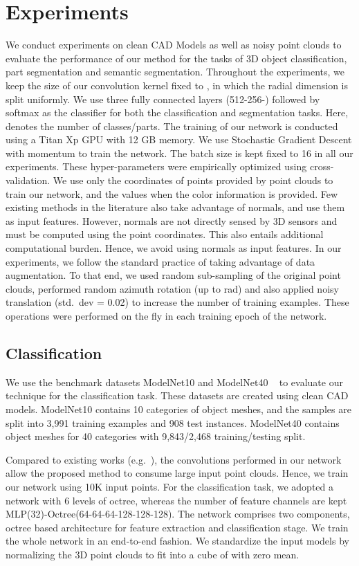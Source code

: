 \documentclass[10pt,twocolumn,letterpaper]{article}
\begin{document}
{\section{Experiments}
\vspace{-2mm}
We conduct experiments on clean CAD Models as well as noisy  point clouds to evaluate the performance of our method for the tasks of 3D object classification, part segmentation and semantic segmentation. Throughout the experiments, we keep the size of our convolution kernel fixed to  , in which the radial dimension is split uniformly. We use three fully connected layers (512-256-) followed by softmax as the classifier for both the classification and segmentation tasks. Here,  denotes the number of classes/parts.
The training of our network is conducted using a Titan Xp GPU with 12 GB memory.
We use Stochastic Gradient Descent with momentum to train the network. The batch size  is kept fixed to 16 in all our experiments.
These hyper-parameters were empirically optimized using cross-validation.
We use only the   coordinates of points provided by point clouds to train our network, and the  values when the color information is provided.
Few existing methods in the literature also take advantage of normals, and use them as input features. 
However, normals are not directly sensed by 3D sensors and must be computed using the point coordinates. This also entails additional computational burden. Hence, we avoid using normals as input features.
In our experiments, we follow the standard practice of taking advantage of data augmentation. 
To that end, we used random sub-sampling of the original  point clouds, performed random azimuth rotation (up to  rad) and also applied noisy translation (std.~dev = 0.02) to increase the number of training examples. These operations were performed on the fly in each training epoch of the network.  \subsection{Classification}
\vspace{-2mm}
We use the  benchmark datasets ModelNet10 and ModelNet40 ~\cite{wu20153d} to evaluate our technique for the classification task.
These  datasets are created using clean CAD models.  ModelNet10 contains 10 categories of object meshes, and the samples are split into 3,991 training examples and 908 test instances. ModelNet40 contains object meshes for 40 categories with 9,843/2,468 training/testing split.

Compared to existing works  
(e.g.~\cite{qi2017pointnet,qi2017pointnetplusplus,shen2018mining,simonovsky2017dynamic}), the  convolutions performed in our network allow the proposed method to consume large input point clouds. Hence, we train our network using 10K input points. For the classification task, we adopted a network with 6 levels of octree, whereas the number of feature channels are kept MLP(32)-Octree(64-64-64-128-128-128). The network comprises two components, octree based architecture for feature extraction and classification stage. We train the whole network in an end-to-end fashion. We  standardize the input models by normalizing the 3D point
clouds to fit into a cube of  with zero mean.


}
\end{document}
